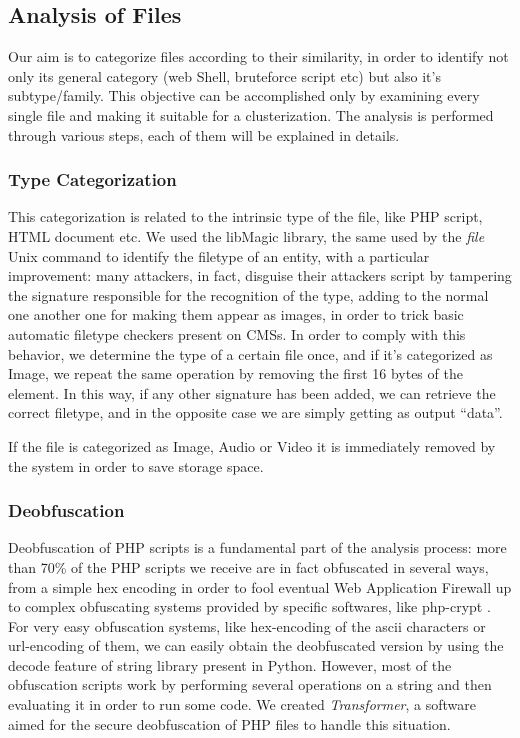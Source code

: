 \subsection{Analysis of Files}

Our aim is to categorize files according to their similarity, in order to identify not only its general category (web Shell, bruteforce script etc) but also it's subtype/family. This objective can be accomplished only by examining every single file and making it suitable for a clusterization.
The analysis is performed through various steps, each of them will be explained in details.

\subsubsection{Type Categorization}
This categorization is related to the intrinsic type of the file, like PHP script, HTML document etc.
We used the libMagic \cite{libmagic} library, the same used by the \emph{file} Unix command to identify the filetype of an entity, with a particular improvement: many attackers, in fact, disguise their attackers script by tampering the signature responsible for the recognition of the type, adding to the normal one another one for making them appear as images, in order to trick basic automatic filetype checkers present on CMSs. In order to comply with this behavior, we determine the type of a certain file once, and if it's categorized as Image, we repeat the same operation by removing the first 16 bytes of the element. In this way, if any other signature has been added, we can retrieve the correct filetype, and in the opposite case we are simply getting as output ``data''.

If the file is categorized as Image, Audio or Video it is immediately removed by the system in order to save storage space.

\subsubsection{Deobfuscation}
Deobfuscation of PHP scripts is a fundamental part of the analysis process: more than 70\% of the PHP scripts we receive are in fact obfuscated in several ways, from a simple hex encoding in order to fool eventual Web Application Firewall up to complex obfuscating systems provided by specific softwares, like php-crypt \cite{phpcrypt}.
For very easy obfuscation systems, like hex-encoding of the ascii characters or url-encoding of them, we can easily obtain the deobfuscated version by using the decode feature of string library present in Python.
However, most of the obfuscation scripts work by performing several operations on a string and then evaluating it in order to run some code. We created \emph{Transformer}, a software aimed for the secure deobfuscation of PHP files to handle this situation.

